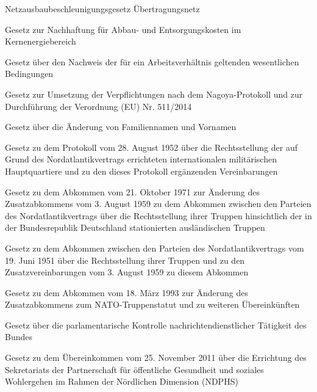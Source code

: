 \item[{NABEG}] Netzausbaubeschleunigungsgesetz Übertragungsnetz

\item[{NachhG}] Gesetz zur Nachhaftung für Abbau- und Entsorgungskosten im Kernenergiebereich

\item[{NachwG}] Gesetz über den Nachweis der für ein Arbeitsverhältnis geltenden wesentlichen Bedingungen

\item[{NagProtUmsG-EUV511-2014DG}] Gesetz zur Umsetzung der Verpflichtungen nach dem Nagoya-Protokoll und zur Durchführung der Verordnung (EU) Nr. 511/2014

\item[{NamÄndG}] Gesetz über die Änderung von Familiennamen und Vornamen

\item[{NATOProtG}] Gesetz zu dem Protokoll vom 28. August 1952 über die Rechtsstellung der auf Grund des Nordatlantikvertrags errichteten internationalen militärischen Hauptquartiere und zu den dieses Protokoll ergänzenden Vereinbarungen

\item[{NATOTrStatÄndZAbkG}] Gesetz zu dem Abkommen vom 21. Oktober 1971 zur Änderung des Zusatzabkommens vom 3. August 1959 zu dem Abkommen zwischen den Parteien des Nordatlantikvertrags über die Rechtsstellung ihrer Truppen hinsichtlich der in der Bundesrepublik Deutschland stationierten ausländischen Truppen

\item[{NATOTrStatVtrG}] Gesetz zu dem Abkommen zwischen den Parteien des Nordatlantikvertrags vom 19. Juni 1951 über die Rechtsstellung ihrer Truppen und zu den Zusatzvereinbarungen vom 3. August 1959 zu diesem Abkommen

\item[{NATOTrStatZAbkÄndAbkG}] Gesetz zu dem Abkommen vom 18. März 1993 zur Änderung des Zusatzabkommens zum NATO-Truppenstatut und zu weiteren Übereinkünften

\item[{NDKontrG}] Gesetz über die parlamentarische Kontrolle nachrichtendienstlicher Tätigkeit des Bundes

\item[{NDPHSG}] Gesetz zu dem Übereinkommen vom 25. November 2011 über die Errichtung des Sekretariats der Partnerschaft für öffentliche Gesundheit und soziales Wohlergehen im Rahmen der Nördlichen Dimension (NDPHS)

